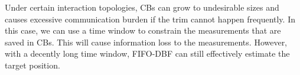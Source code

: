 	
	\begin{rem}
		Under certain interaction topologies, CBs can grow to undesirable sizes and causes excessive communication burden if the trim cannot happen frequently.
		In this case, we can use a time window to constrain the measurements that are saved in CBs.
		This will cause information loss to the measurements.
		However, with a decently long time window, FIFO-DBF can still effectively estimate the target position.
	\end{rem}